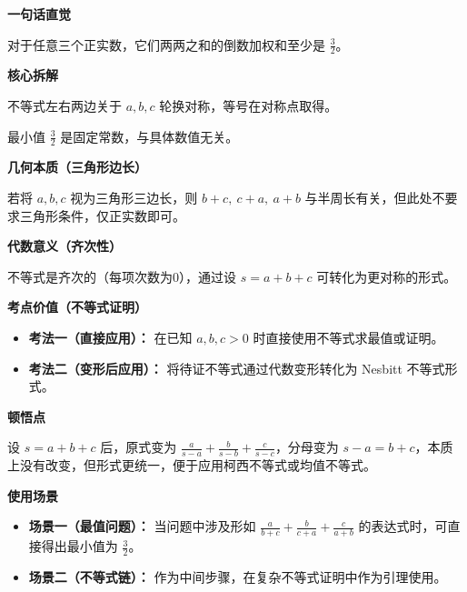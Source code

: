 \begin{explanationbox}
\textbf{\textcolor{CExplanation}{一句话直觉}}

对于任意三个正实数，它们两两之和的倒数加权和至少是 $\frac{3}{2}$。

\medskip
\textbf{\textcolor{CExplanation}{核心拆解}}
\begin{description}[style=nextline, leftmargin=2.8em, labelsep=0.5em, itemsep=0.45em]
    \item[\textbf{要点一（对称性）：}] 不等式左右两边关于 $a,b,c$ 轮换对称，等号在对称点取得。
    \item[\textbf{要点二（下界明确）：}] 最小值 $\frac{3}{2}$ 是固定常数，与具体数值无关。
\end{description}

\medskip
\textbf{\textcolor{CExplanation}{几何本质（三角形边长）}}

若将 $a,b,c$ 视为三角形三边长，则 $b+c,\ c+a,\ a+b$ 与半周长有关，但此处不要求三角形条件，仅正实数即可。

\medskip
\textbf{\textcolor{CExplanation}{代数意义（齐次性）}}

不等式是齐次的（每项次数为0），通过设 $s=a+b+c$ 可转化为更对称的形式。

\medskip
\textbf{\textcolor{CExplanation}{考点价值（不等式证明）}}
\begin{itemize}[leftmargin=*, itemsep=0.5em, topsep=0.4em]
    \item \textbf{考法一（直接应用）：} 在已知 $a,b,c>0$ 时直接使用不等式求最值或证明。
    \item \textbf{考法二（变形后应用）：} 将待证不等式通过代数变形转化为 Nesbitt 不等式形式。
\end{itemize}

\medskip
\textbf{\textcolor{CExplanation}{顿悟点}}

设 $s=a+b+c$ 后，原式变为 $\frac{a}{s-a}+\frac{b}{s-b}+\frac{c}{s-c}$，分母变为 $s-a = b+c$，本质上没有改变，但形式更统一，便于应用柯西不等式或均值不等式。

\medskip
\textbf{\textcolor{CExplanation}{使用场景}}
\begin{itemize}[leftmargin=*, itemsep=0.5em, topsep=0.4em]
    \item \textbf{场景一（最值问题）：} 当问题中涉及形如 $\frac{a}{b+c}+\frac{b}{c+a}+\frac{c}{a+b}$ 的表达式时，可直接得出最小值为 $\frac{3}{2}$。
    \item \textbf{场景二（不等式链）：} 作为中间步骤，在复杂不等式证明中作为引理使用。
\end{itemize}
\end{explanationbox}
